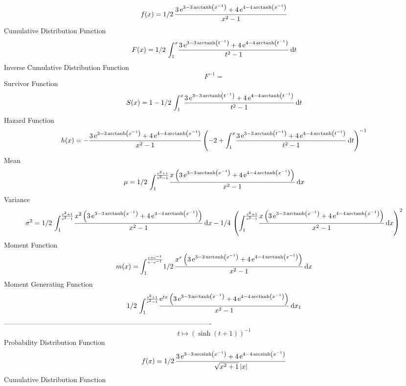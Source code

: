 \documentclass[12pt]{article}
\begin{document}
$$  f(x)=1/2\,{\frac {3\,{{\rm e}^{3-3\,{\rm arctanh} \left({x}^{-1}\right)}}+4
\,{{\rm e}^{4-4\,{\rm arctanh} \left({x}^{-1}\right)}}}{{x}^{2}-1}}
$$Cumulative Distribution Function  
 $$F(x)=1/2\,\int_{1}^{x}\!{\frac {3\,{{\rm e}^{3-3\,{\rm arctanh} \left({t}^{
-1}\right)}}+4\,{{\rm e}^{4-4\,{\rm arctanh} \left({t}^{-1}\right)}}}{
{t}^{2}-1}}\,{\rm d}t
$$ Inverse Cumulative Distribution Function 
  $$F^{-1} = $$Survivor Function 
 $$ S(x)=1-1/2\,\int_{1}^{x}\!{\frac {3\,{{\rm e}^{3-3\,{\rm arctanh} \left({t}
^{-1}\right)}}+4\,{{\rm e}^{4-4\,{\rm arctanh} \left({t}^{-1}\right)}}
}{{t}^{2}-1}}\,{\rm d}t
$$ Hazard Function 
 $$ h(x)=-{\frac {3\,{{\rm e}^{3-3\,{\rm arctanh} \left({x}^{-1}\right)}}+4\,{
{\rm e}^{4-4\,{\rm arctanh} \left({x}^{-1}\right)}}}{{x}^{2}-1}
 \left( -2+\int_{1}^{x}\!{\frac {3\,{{\rm e}^{3-3\,{\rm arctanh} 
\left({t}^{-1}\right)}}+4\,{{\rm e}^{4-4\,{\rm arctanh} \left({t}^{-1}
\right)}}}{{t}^{2}-1}}\,{\rm d}t \right) ^{-1}}
$$Mean 
 $$ \mu=1/2\,\int_{1}^{{\frac {{{\rm e}^{2}}+1}{{{\rm e}^{2}}-1}}}\!{\frac {x
 \left( 3\,{{\rm e}^{3-3\,{\rm arctanh} \left({x}^{-1}\right)}}+4\,{
{\rm e}^{4-4\,{\rm arctanh} \left({x}^{-1}\right)}} \right) }{{x}^{2}-
1}}\,{\rm d}x
$$ Variance 
 $$ \sigma^2 = 1/2\,\int_{1}^{{\frac {{{\rm e}^{2}}+1}{{{\rm e}^{2}}-1}}}\!{\frac {{x
}^{2} \left( 3\,{{\rm e}^{3-3\,{\rm arctanh} \left({x}^{-1}\right)}}+4
\,{{\rm e}^{4-4\,{\rm arctanh} \left({x}^{-1}\right)}} \right) }{{x}^{
2}-1}}\,{\rm d}x-1/4\, \left( \int_{1}^{{\frac {{{\rm e}^{2}}+1}{{
{\rm e}^{2}}-1}}}\!{\frac {x \left( 3\,{{\rm e}^{3-3\,{\rm arctanh} 
\left({x}^{-1}\right)}}+4\,{{\rm e}^{4-4\,{\rm arctanh} \left({x}^{-1}
\right)}} \right) }{{x}^{2}-1}}\,{\rm d}x \right) ^{2}
$$Moment Function 
 $$ m(x) = \int_{1}^{{\frac {{\rm e}+{{\rm e}^{-1}}}{{\rm e}-{{\rm e}^{-1}}}}}\!1
/2\,{\frac {{x}^{r} \left( 3\,{{\rm e}^{3-3\,{\rm arctanh} \left({x}^{
-1}\right)}}+4\,{{\rm e}^{4-4\,{\rm arctanh} \left({x}^{-1}\right)}}
 \right) }{{x}^{2}-1}}\,{\rm d}x
$$ Moment Generating Function 
 $$1/2\,\int_{1}^{{\frac {{{\rm e}^{2}}+1}{{{\rm e}^{2}}-1}}}\!{\frac {{
{\rm e}^{tx}} \left( 3\,{{\rm e}^{3-3\,{\rm arctanh} \left({x}^{-1}
\right)}}+4\,{{\rm e}^{4-4\,{\rm arctanh} \left({x}^{-1}\right)}}
 \right) }{{x}^{2}-1}}\,{\rm d}x_{{1}}
$$-------------------------------------------------------------------------------------------  \\$$t\mapsto  \left( \sinh \left( t+1 \right)  \right) ^{-1}
$$Probability Distribution Function 
$$  f(x)=1/2\,{\frac {3\,{{\rm e}^{3-3\,{\rm arcsinh} \left({x}^{-1}\right)}}+4
\,{{\rm e}^{4-4\,{\rm arcsinh} \left({x}^{-1}\right)}}}{\sqrt {{x}^{2}
+1} \left| x \right| }}
$$Cumulative Distribution Function  
\end{document}
